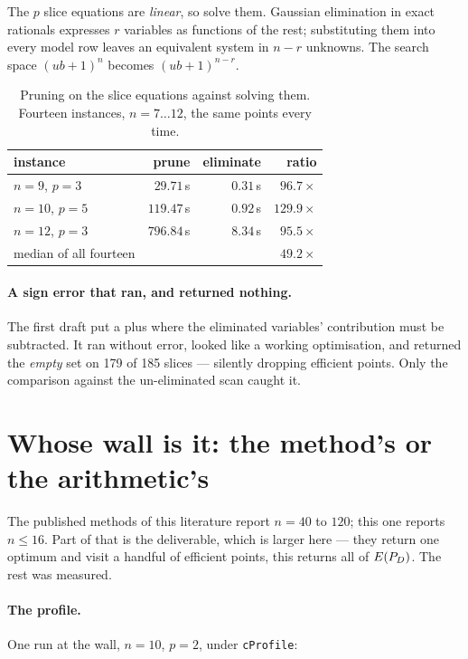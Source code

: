 \documentclass[11pt,a4paper]{article}
\begin{document}
The $p$ slice equations are \emph{linear}, so solve them.  Gaussian elimination
in exact rationals expresses $r$ variables as functions of the rest;
substituting them into every model row leaves an equivalent system in $n - r$
unknowns.  The search space $(ub+1)^{n}$ becomes $(ub+1)^{n-r}$.

\begin{table}[h]
\centering
\caption{Pruning on the slice equations against solving them.  Fourteen
instances, $n = 7 \dots 12$, the same points every time.}
\begin{tabular}{lrrr}
\toprule
instance & prune & eliminate & ratio \\
\midrule
$n=9$, $p=3$  & $29.71$\,s  & $0.31$\,s & $96.7\times$ \\
$n=10$, $p=5$ & $119.47$\,s & $0.92$\,s & $129.9\times$ \\
$n=12$, $p=3$ & $796.84$\,s & $8.34$\,s & $95.5\times$ \\
\midrule
median of all fourteen & & & $\mathbf{49.2\times}$ \\
\bottomrule
\end{tabular}
\end{table}

\paragraph{A sign error that ran, and returned nothing.}  The first draft put a
plus where the eliminated variables' contribution must be subtracted.  It ran
without error, looked like a working optimisation, and returned the
\emph{empty} set on 179 of 185 slices --- silently dropping efficient points.
Only the comparison against the un-eliminated scan caught it.

\section{Whose wall is it: the method's or the arithmetic's}
\label{sec:whosewall}

The published methods of this literature report $n = 40$ to $120$; this one
reports $n \leqslant 16$.  Part of that is the deliverable, which is larger
here --- they return one optimum and visit a handful of efficient points,
this returns all of $E(P_{D})$.  The rest was measured.

\paragraph{The profile.}  One run at the wall, $n = 10$, $p = 2$, under
\texttt{cProfile}:
\end{document}
